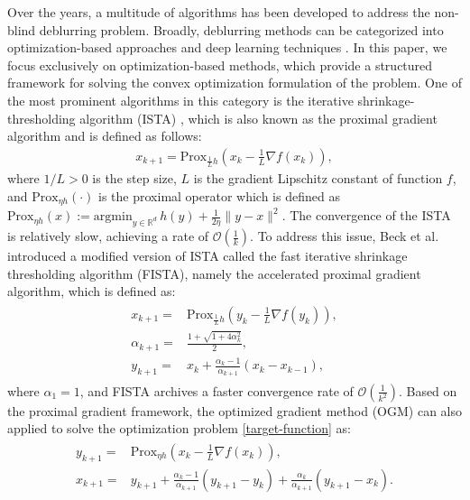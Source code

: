 \documentclass{article}
\begin{document}
Over the years, a multitude of algorithms has been developed to address the non-blind deblurring problem. Broadly, deblurring methods can be categorized into optimization-based approaches \cite{Beck17, Nesterov18} and deep learning techniques \cite{QuanLXNJ22, BarmanD24, HuiLLJPCZ24}. In this paper, we focus exclusively on optimization-based methods, which provide a structured framework for solving the convex optimization formulation of the problem. One of the most prominent algorithms in this category is the iterative shrinkage-thresholding algorithm (ISTA) \cite{DaubechiesDM04}, which is also known as the proximal gradient algorithm and is defined as follows:
\begin{eqnarray}
x_{k+1} = \mathrm{Prox}_{\frac{1}{L}h} (x_{k}-\frac{1}{L}\nabla f(x_{k})), \label{ISTA}
\end{eqnarray}
where $1/L>0$ is the step size, $L$ is the gradient Lipschitz constant of function $f$, and $\mathrm{Prox}_{\eta h}(\cdot)$ is the proximal operator which is defined as $\mathrm{Prox}_{\eta h}(x):=\mathrm{argmin}_{y\in\mathbb{R}^{d}}\, h(y) +\frac{1}{2\eta}\|y-x\|^{2}$. The convergence of the ISTA is relatively slow, achieving a rate of $\mathcal{O}(\frac{1}{k})$. To address this issue, Beck et al. \cite{BeckT09} introduced a modified version of ISTA called the fast iterative shrinkage thresholding algorithm (FISTA), namely the accelerated proximal gradient algorithm, which is defined as:
\begin{eqnarray}
\begin{aligned}
x_{k+1} =& \mathrm{Prox}_{\frac{1}{L} h} (y_{k}-\frac{1}{L}\nabla f(y_{k})),\\		\alpha_{k+1}=&\frac{1+\sqrt{1+4\alpha_{k}^{2}}}{2},\\
y_{k+1}=&x_{k}+\frac{\alpha_{k}-1}{\alpha_{k+1}}(x_{k}-x_{k-1}),
\end{aligned} \label{FISTA}	
\end{eqnarray}
where $\alpha_{1}=1$, and FISTA archives a faster convergence rate of $\mathcal{O}(\frac{1}{k^{2}})$. Based on the proximal gradient framework, the  optimized gradient method (OGM) \cite{KimF16} can also applied to solve the optimization problem \eqref{target-function} as:
\begin{eqnarray}
\begin{aligned}
y_{k+1}=&\mathrm{Prox}_{\eta h}(x_{k}-\frac{1}{L}\nabla f(x_{k})),\\
x_{k+1}=&y_{k+1}+\frac{\alpha_{k}-1}{\alpha_{k+1}}(y_{k+1}-y_{k})+ \frac{\alpha_{k}}{\alpha_{k+1}}(y_{k+1}-x_{k}).
\end{aligned} \label{POGM}
\end{eqnarray}
\end{document}
